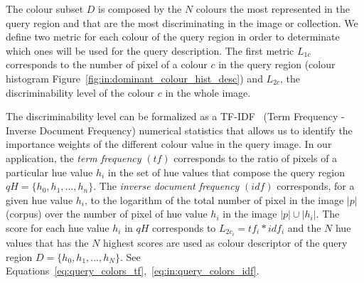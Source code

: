 




The colour subset $D$ is composed by the $N$ colours the most represented in the query region and that are the most discriminating in the image or collection.
We define two metric for each colour of the query region in order to determinate which ones will be used for the query description.
The first metric $L_{1c}$ corresponds to the number of pixel of a colour $c$ in the query region (colour histogram Figure~\ref{fig:in:dominant_colour_hist_desc}) and $L_{2c}$, the discriminability level of the colour $c$ in the whole image.

The discriminability level can be formalized as a TF-IDF~\cite{salton1986introduction} (Term Frequency - Inverse Document Frequency) numerical statistics that allows us to identify the importance weights of the different colour value in the query image.
In our application, the {\it term frequency} $(tf)$ corresponds to the ratio of pixels of a particular hue value $h_i$ in the set of hue values that compose the query region $qH=\{h_0, h_1,...,h_n\}$.%
The {\it inverse document frequency} $(idf)$ corresponds, for a given hue value $h_i$, to the logarithm of the total number of pixel in the image $|p|$ (corpus) over the number of pixel of hue value $h_i$ in the image $|p| \cup |h_i|$.
The score for each hue value $h_i$ in $qH$ corresponds to $L_{2c_i} = tf_i * idf_i$ and the $N$ hue values that has the $N$ highest scores are used as colour descriptor of the query region $D=\{h_0,h_1,...,h_N\}$.
See Equations~\ref{eq:query_colors_tf},~\ref{eq:in:query_colors_idf}.%

